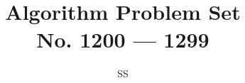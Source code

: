 \documentclass[a4paper,12pt]{article}
\title{Algorithm Problem Set \\ \large No. 1200 --- 1299}
\author{SS}
\begin{document}
\renewcommand{\thelstlisting}{\thesection.\arabic{lstlisting}}
\newcommand{\fcc}[1]{\lstinline[language=C++, basicstyle=\small\ttfamily, keywordstyle=\bfseries\color{green!40!black}]|#1|}
\newcommand{\fcj}[1]{\lstinline[language=Java, basicstyle=\small\ttfamily, keywordstyle=\bfseries\color{green!40!black}]|#1|}
\maketitle


%
%
%
%
%
%
%
%
%
%
%
%
%
%
%
%
%
%
%
%
%
%
%
%
%
%
%
%
%
%
%
%
%
%
%
%
%
%
%
%
%
%
%
%
%
%
%
%
%
%
%
%
%
%
%
%
%
%
%
%
%
%
%
%
%
%
%
%
%
%
%
%
%
%
%
%
%
%
%
%
%
%
%
%
%
%
%
%
%
%
%
%
%
%
%
%
%
%
\end{document}
